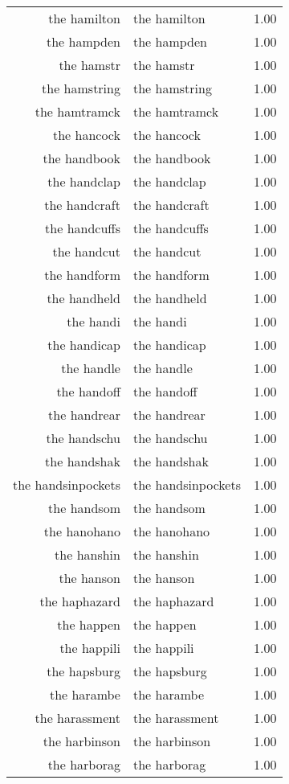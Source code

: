 \begin{table}[ht]
\begin{tabular}{rlr}
  the hamilton & the hamilton & 1.00 \\ 
  the hampden & the hampden & 1.00 \\ 
  the hamstr & the hamstr & 1.00 \\ 
  the hamstring & the hamstring & 1.00 \\ 
  the hamtramck & the hamtramck & 1.00 \\ 
  the hancock & the hancock & 1.00 \\ 
  the handbook & the handbook & 1.00 \\ 
  the handclap & the handclap & 1.00 \\ 
  the handcraft & the handcraft & 1.00 \\ 
  the handcuffs & the handcuffs & 1.00 \\ 
  the handcut & the handcut & 1.00 \\ 
  the handform & the handform & 1.00 \\ 
  the handheld & the handheld & 1.00 \\ 
  the handi & the handi & 1.00 \\ 
  the handicap & the handicap & 1.00 \\ 
  the handle & the handle & 1.00 \\ 
  the handoff & the handoff & 1.00 \\ 
  the handrear & the handrear & 1.00 \\ 
  the handschu & the handschu & 1.00 \\ 
  the handshak & the handshak & 1.00 \\ 
  the handsinpockets & the handsinpockets & 1.00 \\ 
  the handsom & the handsom & 1.00 \\ 
  the hanohano & the hanohano & 1.00 \\ 
  the hanshin & the hanshin & 1.00 \\ 
  the hanson & the hanson & 1.00 \\ 
  the haphazard & the haphazard & 1.00 \\ 
  the happen & the happen & 1.00 \\ 
  the happili & the happili & 1.00 \\ 
  the hapsburg & the hapsburg & 1.00 \\ 
  the harambe & the harambe & 1.00 \\ 
  the harassment & the harassment & 1.00 \\ 
  the harbinson & the harbinson & 1.00 \\ 
  the harborag & the harborag & 1.00 \\ 

\end{tabular}
\end{table}
